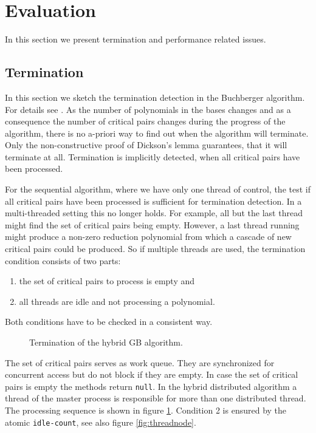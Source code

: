 \documentclass[10pt,twocolumn,a4paper]{article}
\newcommand{\code}[1]{\texttt{#1}}
\begin{document}
\section{Evaluation} 

In this section we present termination and performance related issues.

\subsection{Termination} \label{sec:termi}

In this section we sketch the termination detection in the Buchberger
algorithm. For details see \cite{Kredel:2010}.  As the number of
polynomials in the bases changes and as a consequence the number of
critical pairs changes during the progress of the algorithm, there is
no a-priori way to find out when the algorithm will terminate. Only
the non-constructive proof of Dickson's lemma guarantees, that it will
terminate at all.  Termination is implicitly detected, when all
critical pairs have been processed.

For the sequential algorithm, where we have only one thread of
control, the test if all critical pairs have been processed is
sufficient for termination detection. In a multi-threaded setting this
no longer holds. For example, all but the last thread might find the
set of critical pairs being empty. However, a last thread running
might produce a non-zero reduction polynomial from which a cascade of
new critical pairs could be produced.  So if multiple threads are
used, the termination condition consists of two parts:
\begin{enumerate}
\item the set of critical pairs to process is empty and
\item all threads are idle and not processing a polynomial.
\end{enumerate}
Both conditions have to be checked in a consistent way.

\begin{figure}[thb]
\centering
{}
\caption{Termination of the hybrid GB algorithm.}
\label{fig:hybridtermination}
\end{figure}

The set of critical pairs serves as work queue. They are synchronized
for concurrent access but do not block if they are empty. In case the
set of critical pairs is empty the methods return \code{null}.  In the
hybrid distributed algorithm a thread of the master process is
responsible for more than one distributed thread.  The processing
sequence is shown in figure \ref{fig:hybridtermination}. Condition 2
is ensured by the atomic \code{idle-count}, see also figure
\ref{fig:threadnode}.
\end{document}
